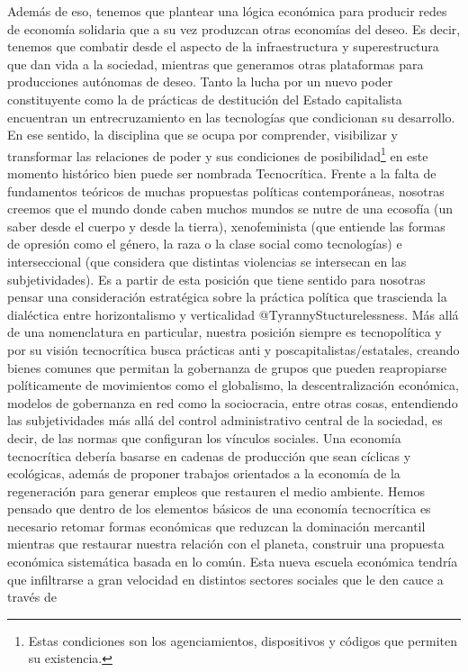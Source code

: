 \documentclass[
]{article}
\begin{document}
Además de eso, tenemos que plantear una lógica económica para producir
redes de economía solidaria que a su vez produzcan otras economías del
deseo. Es decir, tenemos que combatir desde el aspecto de la
infraestructura y superestructura que dan vida a la sociedad, mientras
que generamos otras plataformas para producciones autónomas de deseo.
Tanto la lucha por un nuevo poder constituyente como la de prácticas de
destitución del Estado capitalista encuentran un entrecruzamiento en las
tecnologías que condicionan su desarrollo. En ese sentido, la disciplina
que se ocupa por comprender, visibilizar y transformar las relaciones de
poder y sus condiciones de posibilidad\footnote{Estas condiciones son
  los agenciamientos, dispositivos y códigos que permiten su existencia.}
en este momento histórico bien puede ser nombrada Tecnocrítica. Frente a
la falta de fundamentos teóricos de muchas propuestas políticas
contemporáneas, nosotras creemos que el mundo donde caben muchos mundos
se nutre de una ecosofía (un saber desde el cuerpo y desde la tierra),
xenofeminista (que entiende las formas de opresión como el género, la
raza o la clase social como tecnologías) e interseccional (que considera
que distintas violencias se intersecan en las subjetividades). Es a
partir de esta posición que tiene sentido para nosotras pensar una
consideración estratégica sobre la práctica política que trascienda la
dialéctica entre horizontalismo y verticalidad @TyrannyStucturelessness.
Más allá de una nomenclatura en particular, nuestra posición siempre es
tecnopolítica y por su visión tecnocrítica busca prácticas anti y
poscapitalistas/estatales, creando bienes comunes que permitan la
gobernanza de grupos que pueden reapropiarse políticamente de
movimientos como el globalismo, la descentralización económica, modelos
de gobernanza en red como la sociocracia, entre otras cosas, entendiendo
las subjetividades más allá del control administrativo central de la
sociedad, es decir, de las normas que configuran los vínculos sociales.
Una economía tecnocrítica debería basarse en cadenas de producción que
sean cíclicas y ecológicas, además de proponer trabajos orientados a la
economía de la regeneración para generar empleos que restauren el medio
ambiente. Hemos pensado que dentro de los elementos básicos de una
economía tecnocrítica es necesario retomar formas económicas que
reduzcan la dominación mercantil mientras que restaurar nuestra relación
con el planeta, construir una propuesta económica sistemática basada en
lo común. Esta nueva escuela económica tendría que infiltrarse a gran
velocidad en distintos sectores sociales que le den cauce a través de
\end{document}
